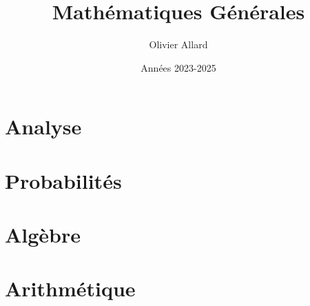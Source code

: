 \documentclass[12pt, a4paper, twoside]{report}
\author{Olivier Allard}
\title{Mathématiques Générales}
\date{Années 2023-2025}
\begin{document}


\tableofcontents

\begin{comment}
    
    \part{Techniques de calcul}
    
    
    
\end{comment}

\part{Analyse}
    






\part{Probabilités}
    


    
\part{Algèbre}
    



    
\part{Arithmétique}
    

    
\end{document}
